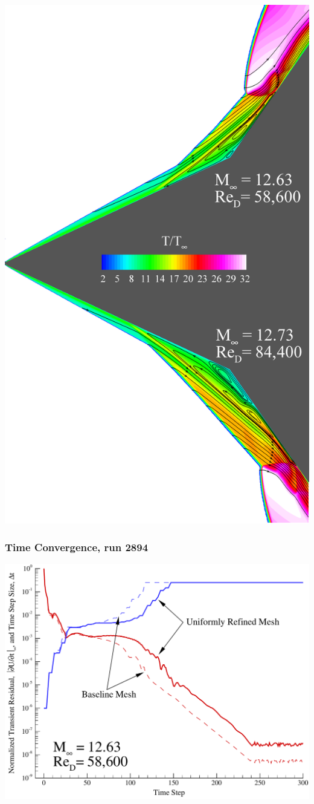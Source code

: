 \documentclass[compress,11pt]{beamer}
\begin{document}
{\begin{center}
    \includegraphics[height=.85\textheight]{figures/2893_2894_composite_streamlines}
  \end{center}
}

\frame
{
  \frametitle{\scriptsize Time Convergence, run 2894}
  \centerline{\includegraphics[height=.85\textheight]{figures/aedc_double_cone/2894/resid_history}}
}
\end{document}
